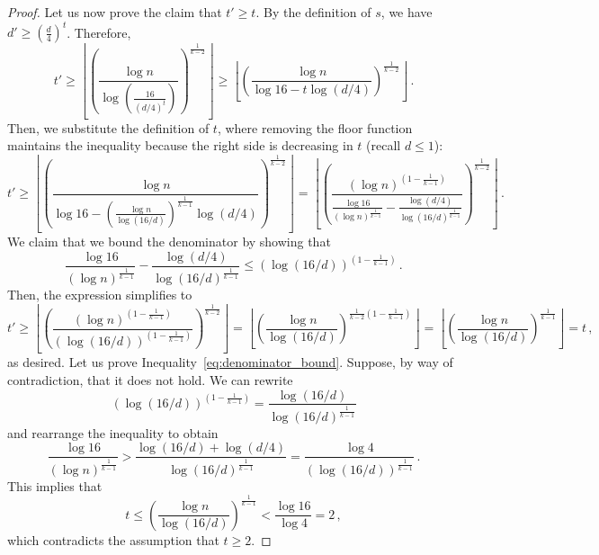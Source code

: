 \begin{theorem}
\begin{proof}
        Let us now prove the claim that $t' \geq t$.
        By the definition of $s$, we have $d' \geq \left( \frac{d}{4} \right)^t$.
        Therefore,
        \[
            t' \geq
            \left\lfloor \left(  \frac{\log n}{\log \left(\frac{16}{(d/4)^t}\right)} \right)^
            {\frac{1}{k-2}} \right\rfloor \geq
            \left\lfloor \left(  \frac{\log n}{\log 16 - t \log (d/4)} \right)^
            {\frac{1}{k-2}} \right\rfloor\,.
        \]
        Then, we substitute the definition of $t$, where removing the floor function
        maintains the inequality because the right side is decreasing in $t$ (recall $d \leq 1$):
        \begin{equation*}
            t' \geq
            \left\lfloor \left(  \frac{\log n}
            {\log 16 - \left(  \frac{\log n}{\log (16/d)} \right)^{\frac{1}{k-1}}  \log (d/4)} \right)^
            {\frac{1}{k-2}} \right\rfloor
            =
            \left\lfloor \left(  \frac{(\log n)^{\left(1-\frac{1}{k-1}\right)}}
            {\frac{\log 16}{(\log n)^{\frac{1}{k-1}}} - \frac{\log (d/4)}{\log (16/d)^{\frac{1}{k-1}}} }
            \right)^{\frac{1}{k-2}} \right\rfloor\,.
        \end{equation*}
        We claim that we bound the denominator by showing that
        \begin{equation} \label{eq:denominator_bound}
            \frac{\log 16}{(\log n)^{\frac{1}{k-1}}} - \frac{\log (d/4)}{\log (16/d)^{\frac{1}{k-1}}}
            \leq \left( \log (16/d) \right)^{\left( 1 - \frac{1}{k-1} \right)}\,.
        \end{equation}
        Then, the expression simplifies to
        \[
            t'
            \geq \left\lfloor \left(  \frac{(\log n)^{\left(1-\frac{1}{k-1}\right)}}
            {\left( \log (16/d) \right)^{\left( 1 - \frac{1}{k-1} \right)}}
            \right)^{\frac{1}{k-2}} \right\rfloor
            = \left\lfloor \left(  \frac{\log n}
            {\log (16/d)}
            \right)^{\frac{1}{k-2}\left( 1 - \frac{1}{k-1} \right)} \right\rfloor
            = \left\lfloor \left(  \frac{\log n}{\log (16/d)} \right)^{\frac{1}{k-1}} \right\rfloor
            = t\,,
        \]
        as desired.
        Let us prove Inequality~\eqref{eq:denominator_bound}.
        Suppose, by way of contradiction, that it does not hold.
        We can rewrite
        \[
            (\log (16/d))^{\left( 1 - \frac{1}{k-1} \right)}
            = \frac{\log (16/d)}{\log (16/d)^{\frac{1}{k-1}}}
        \]
        and rearrange the inequality to obtain
        \[
            \frac{\log 16}{(\log n)^{\frac{1}{k-1}}}
            > \frac{\log (16/d) + \log (d/4)}{\log (16/d)^{\frac{1}{k-1}}}
            = \frac{\log 4}{(\log (16/d))^{\frac{1}{k-1}}}\,.
        \]
        This implies that
        \[
            t
            \leq \left( \frac{\log n}{\log (16/d)} \right)^{\frac{1}{k-1}}
            < \frac{\log 16}{\log 4} = 2\,,
        \]
        which contradicts the assumption that $t \geq 2$.
    \end{proof}
\end{theorem}

